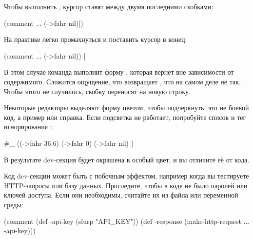 Чтобы выполнить , курсор ставят между двумя последними скобками:

\begin{english}
  \begin{clojure}
(comment
  ...
  (->fahr nil)|)
  \end{clojure}
\end{english}

На практике легко промахнуться и поставить курсор в конец:

\begin{english}
  \begin{clojure}
(comment
  ...
  (->fahr nil)) |
  \end{clojure}
\end{english}

В этом случае команда  выполнит форму , которая вернёт  вне зависимости от содержимого. Сложится ощущение, что  возвращает , что на самом деле не так. Чтобы этого не случилось, скобку  переносят на новую строку.

Некоторые редакторы выделяют форму  цветом, чтобы подчеркнуть: это не боевой код, а пример или справка. Если подсветка не работает, попробуйте список и тег игнорирования \code{\#\_}:

\begin{english}
  \begin{clojure}
#_
((->fahr 36.6)
  (->fahr 0)
  (->fahr nil)
)
  \end{clojure}
\end{english}

В результате dev-секция будет окрашена в особый цвет, и вы отличите её от кода.

Код dev-секции может быть с побочным эффектом, например когда вы тестируете HTTP-запросы или базу данных. Проследите, чтобы в коде не было паролей или ключей доступа. Если они необходимы, считайте их из файла или переменной среды:

\begin{english}
  \begin{clojure}
(comment
  (def -api-key
    (slurp "API_KEY"))
  (def -response
    (make-http-request ... -api-key)))
  \end{clojure}
\end{english}

\def\urlzipclj{https://github.com/clojure/clojure/blob/master/src/clj/clojure/zip.clj\#L281}

